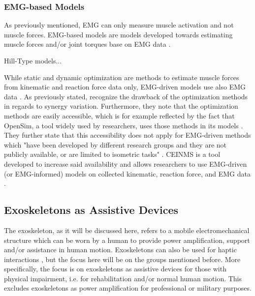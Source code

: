 
\clearpage
\subsubsection{\ac{EMG}-based Models}
\label{sec:A-EMGBasedModels}
As previously mentioned, \ac{EMG} can only measure muscle activation and not muscle forces.
\ac{EMG}-based models are models developed towards estimating muscle forces and/or joint torques base on \ac{EMG} data \cite{Pizzolato2015, Erdemir2007}.

Hill-Type models... 

While static and dynamic optimization are methods to estimate muscle forces from kinematic and reaction force data only, \ac{EMG}-driven models use also \ac{EMG} data \cite{Pizzolato2015}.
As previously stated,  recognize the drawback of the optimization methods in regards to synergy variation. 
Furthermore, they note that the optimization methods are easily accessible, which is for example reflected by the fact that OpenSim, a tool widely used by researchers, uses those methods in its models \cite{Delp2007,Pizzolato2015,Seth2018}. 
They further state that this accessibility does not apply for EMG-driven methods which "have been developed by different research groups and they are not publicly available, or are limited to isometric tasks" \cite[p. 1]{Pizzolato2015}.
CEINMS is a tool developed to increase said availability and allows researchers to use \ac{EMG}-driven (or \ac{EMG}-informed) models on collected kinematic, reaction force, and \ac{EMG} data \cite{Pizzolato2015}.




\subsection{Exoskeletons as Assistive Devices}
\label{sec:A-Exoskeletons}
The exoskeleton, as it will be discussed here, refers to a mobile electromechanical structure which can be worn by a human to provide power amplification, support and/or assistance in human motion. Exoskeletons can also be used for haptic interactions \cite{Anam2012}, but the focus here will be on the groups mentioned before. More specifically, the focus is on exoskeletons as assistive devices for those with physical impairment, i.e. for rehabilitation and/or normal human motion. This excludes exoskeletons as power amplification for professional or military purposes.

